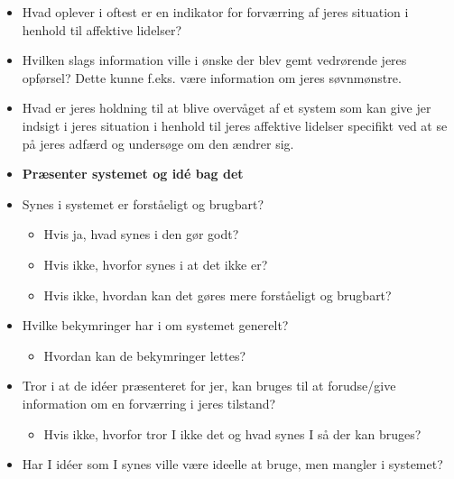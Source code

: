 \begin{itemize}
\item Hvad oplever i oftest er en indikator for forværring af jeres situation i henhold til affektive lidelser?
\item Hvilken slags information ville i ønske der blev gemt vedrørende jeres opførsel? Dette kunne f.eks. være information om jeres søvnmønstre.
\item Hvad er jeres holdning til at blive overvåget af et system som kan give jer indsigt i jeres situation i henhold til jeres affektive lidelser specifikt ved at se på jeres adfærd og undersøge om den ændrer sig.
\item \textbf{Præsenter systemet og idé bag det}
\item Synes i systemet er forståeligt og brugbart?
	   \begin{itemize}
	   \item Hvis ja, hvad synes i den gør godt?
	   \item Hvis ikke, hvorfor synes i at det ikke er?
	   \item Hvis ikke, hvordan kan det gøres mere forståeligt og brugbart? 
	   \end{itemize}
\item Hvilke bekymringer har i om systemet generelt?
	  \begin{itemize}
	  \item Hvordan kan de bekymringer lettes?
	  \end{itemize}
\item Tror i at de idéer præsenteret for jer, kan bruges til at forudse/give information om en forværring i jeres tilstand?
	   \begin{itemize}
	   \item Hvis ikke, hvorfor tror I ikke det og hvad synes I så der kan bruges?
	   \end{itemize}
\item Har I idéer som I synes ville være ideelle at bruge, men mangler i systemet?

\end{itemize}

